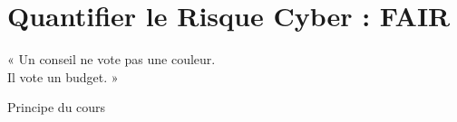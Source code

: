 
\chapter{Quantifier le Risque Cyber : FAIR}
\label{chap:fair}

\epigraph{%
    « Un conseil ne vote pas une couleur.\\
    Il vote un budget. »%
}{Principe du cours}


